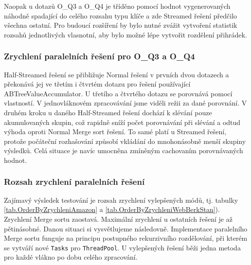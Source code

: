 Naopak u dotazů O\_Q3 a O\_Q4 je tříděno pomocí hodnot vygenerovaných náhodně spadající do celého rozsahu typu klíče a zde Streamed řešení předčilo všechna ostatní. 
Pro budoucí rozšíření by bylo nutné zvážit vytvoření statistik rozsahů jednotlivých vlasnotní, aby bylo možné lépe vytvořit rozdělení přihrádek.

\subsubsection{Zrychlení paralelních řešení pro O\_Q3 a O\_Q4 }

Half-Streamed řešení se přibližuje Normal řešení v prvních dvou dotazech a překonává jej ve třetím i čtvrtém dotazu pro řešení používající ABTreeValueAccumulator.
U třetího a čtvrtého dotazu se porovnává pomocí vlastností. V jednovláknovém zpracovávání jsme viděli režii za dané porovnání.
V druhém kroku u daného Half-Streamed řešení dochází k slévání pouze akumulovaných skupin, což rapidně sníží počet porovnávání při slévání a odtud výhoda oproti Normal Merge sort řešení. 
To samé platí u Streamed řešení, protože počáteční rozhašování způsobí vkládání do mnohonásobně menší skupiny výsledků. 
Celá situace je navíc umocněna zmíněným cachovaním porovnávaných hodnot. 

\subsubsection{Rozsah zrychlení paralelních řešení}

Zajímavý výsledek testování je rozsah zrychlení vylepšených módů, tj. tabulky \ref{tab.OrderByZrychleniAmazon} a \ref{tab.OrderByZrychleniWebBerkStan}). 
Zrychlení Merge sortu zaostavá. 
Maximální zrychlení u ostatních řešení je až pětinásobné. 
Danou situaci si vysvětlujeme následovně.
Implementace paralelního Merge sortu funguje na principu postupného rekurzivního rozdělování, při kterém se vytváří nové \verb+Tasks+ pro \verb+ThreadPool+.
U vylepšených řešení běži jedna metoda pro každé vlákno po dobu celého zpracování. 


